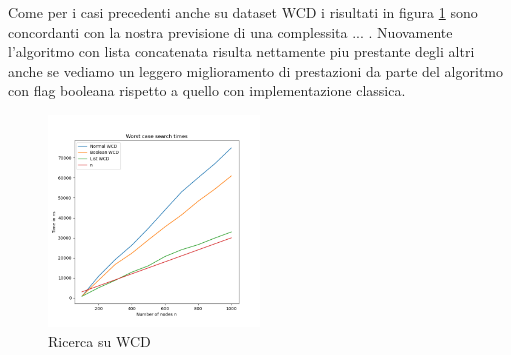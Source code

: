 Come per i casi precedenti anche su dataset WCD i risultati in figura \ref{fig:wdcsearch} sono concordanti con la nostra previsione di una complessita ... .
Nuovamente l'algoritmo con lista concatenata risulta nettamente piu prestante degli altri anche se vediamo un leggero miglioramento di prestazioni da parte 
del algoritmo con flag booleana rispetto a quello con implementazione classica.
\begin{figure}[H]
  \centering
  \includegraphics[width=0.5\textwidth]{Resources/ABR_Resources/WDsearch.png}
  \caption{Ricerca su WCD}
  \label{fig:wdcsearch}
\end{figure}


